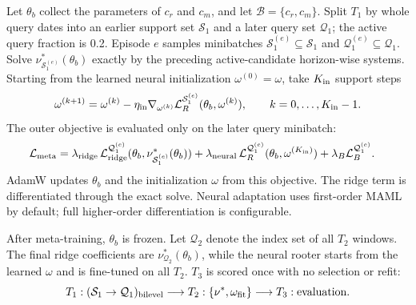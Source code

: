 \documentclass[10pt]{article}
\newcommand{\Tone}{T_1}
\newcommand{\Ttwo}{T_2}
\newcommand{\Tthree}{T_3}
\begin{document}
\iffalse
Let $\theta_b$ collect the parameters of $c_r$ and $c_m$, and let
$\mathcal B=\{c_r,c_m\}$. Split $\Tone$ by whole query dates into an earlier
support set $\mathcal S_1$ and a later query set $\mathcal Q_1$; the active
query fraction is 0.2. Episode $e$ samples minibatches
$\mathcal S_1^{(e)}\subseteq\mathcal S_1$ and
$\mathcal Q_1^{(e)}\subseteq\mathcal Q_1$. Solve
$\nu^*_{\mathcal S_1^{(e)}}(\theta_b)$ exactly by the preceding active-candidate
horizon-wise systems. Starting from the learned neural initialization
$\omega^{(0)}=\omega$, take $K_{\rm in}$ support steps
\[
 \omega^{(k+1)}=\omega^{(k)}-\eta_{\rm in}
 \nabla_{\omega^{(k)}}\mathcal L_R^{\mathcal S_1^{(e)}}
 (\theta_b,\omega^{(k)}),\qquad k=0,\ldots,K_{\rm in}-1.
\]
The outer objective is evaluated only on the later query minibatch:
\begin{align}
 \mathcal L_{\rm meta}
 &=\lambda_{\rm ridge}\,
 \mathcal L_{\rm ridge}^{\mathcal Q_1^{(e)}}
 (\theta_b,\nu^*_{\mathcal S_1^{(e)}}(\theta_b))
 +\lambda_{\rm neural}\,
 \mathcal L_R^{\mathcal Q_1^{(e)}}(\theta_b,\omega^{(K_{\rm in})})
 +\lambda_B\mathcal L_B^{\mathcal Q_1^{(e)}}.
\end{align}
AdamW updates $\theta_b$ and the initialization $\omega$ from this objective.
The ridge term is differentiated through the exact solve. Neural adaptation uses
first-order MAML by default; full higher-order differentiation is configurable.

After meta-training, $\theta_b$ is frozen. Let $\mathcal Q_2$ denote the index
set of all $\Ttwo$ windows. The final ridge coefficients are
$\nu^*_{\mathcal Q_2}(\theta_b)$, while the neural rooter starts
from the learned $\omega$ and is fine-tuned on all $\Ttwo$. $\Tthree$ is scored
once with no selection or refit:
\[
 \Tone:(\mathcal S_1\rightarrow\mathcal Q_1)_{\rm bilevel}
 \longrightarrow \Ttwo:\{\nu^*,\omega_{\rm fit}\}
 \longrightarrow \Tthree:\text{evaluation}.
\]
\end{document}
